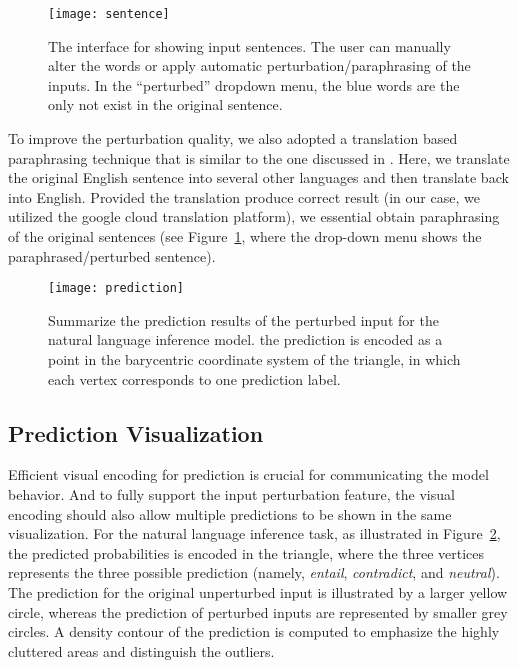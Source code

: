 \begin{figure}[htbp]
\centering
\vspace{-2mm}
 \texttt{[image: sentence]}
 \caption{
The interface for showing input sentences. The user can manually alter the words or apply automatic perturbation/paraphrasing of the inputs. In the ``perturbed'' dropdown menu, the blue words are the only not exist in the original sentence.
 }
\label{fig:sentence}
\end{figure}

To improve the perturbation quality, we also adopted a translation based paraphrasing technique that is similar to the one discussed in \cite{mallinson2017paraphrasing}. Here, we translate the original English sentence into several other languages and then translate back into English. Provided the translation produce correct result (in our case, we utilized the google cloud translation platform), we essential obtain paraphrasing of the original sentences (see Figure~\ref{fig:sentence}, where the drop-down menu shows the paraphrased/perturbed sentence).

\begin{figure}[htbp]
\centering
\vspace{-2mm}
 \texttt{[image: prediction]}
 \caption{
Summarize the prediction results of the perturbed input for the natural language inference model.
the prediction is encoded as a point in the barycentric coordinate system of the triangle, in which each vertex corresponds to one prediction label.
}
\label{fig:prediction}
\end{figure}

\subsection{Prediction Visualization}
Efficient visual encoding for prediction is crucial for communicating the model behavior. And to fully support the input perturbation feature, the visual encoding should also allow multiple predictions to be shown in the same visualization.
%
For the natural language inference task, as illustrated in Figure~\ref{fig:prediction}, the predicted probabilities is encoded in the triangle, where the three vertices represents the three possible prediction (namely, \emph{entail}, \emph{contradict}, and \emph{neutral}). The prediction for the original unperturbed input is illustrated by a larger yellow circle, whereas the prediction of perturbed inputs are represented by smaller grey circles.
A density contour of the prediction is computed to emphasize the highly cluttered areas and distinguish the outliers.


